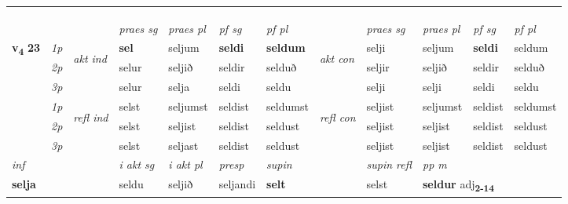 \begin{longtable}[l]{X>{\footnotesize\itshape}llXXXXlXXXX}
\midrule
 & \\*
   & \\*
  & \\
   \midrule
 & &   & \textit{praes sg}  & \textit{praes pl}    & \textit{ pf sg} & \textit{pf pl} & & \textit{praes sg}  & \textit{praes pl}    & \textit{pf sg} & \textit{pf pl }  \\ \cmidrule{4-7} \cmidrule{9-12}
 \multirow{2}{*}{{{\textbf{v{\textsubscript{4}}} \Large{\textbf{23}}}}}  & 1p & \multirow{3}{*}{\begin{turn}{90}\textit{akt ind}\end{turn}} & \textbf{sel} & seljum & \textbf{seldi} & \textbf{seldum} & \multirow{3}{*}{\begin{turn}{90}\textit{akt con}\end{turn}} &selji & seljum & \textbf{seldi} & seldum\\*
 & 2p &  &  selur  & seljið & seldir & selduð & & seljir & seljið & seldir & selduð \\*
 & 3p &  & selur & selja & seldi & seldu & & selji & selji& seldi & seldu \\*
\cmidrule{4-7} \cmidrule{9-12}
 & 1p & \multirow{3}{*}{\begin{turn}{90}\textit{refl ind}\end{turn}}  & selst & seljumst & seldist & seldumst & \multirow{3}{*}{\begin{turn}{90}\textit{refl con}\end{turn}}  &seljist & seljumst & seldist & seldumst \\*
 & 2p &  & selst & seljist & seldist & seldust & &seljist & seljist & seldist & seldust \\*
 & 3p  & & selst & seljast & seldist & seldust & & seljist & seljist& seldist & seldust \\*
\cmidrule{4-7} \cmidrule{9-12}

   {\textit{inf}} & &  & \textit{i akt sg} & \textit{i akt pl}   & \textit{presp} & \textit{supin} && \textit{supin refl} & \textit{pp m} \\*
  {\textbf{selja}} & && seldu  & seljið   & seljandi &  \textbf{selt} && selst & \multicolumn{2}{l}{\textbf{seldur} adj\textbf{\textsubscript{2-14}}} \\*

\midrule


\end{longtable}
